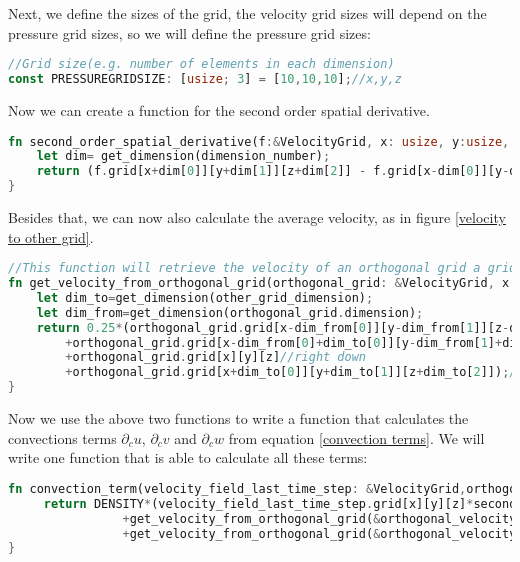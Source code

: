 \documentclass{article}
\begin{document}
Next, we define the sizes of the grid, the velocity grid sizes will depend on the pressure grid sizes, so we will define the pressure grid sizes:
\begin{lstlisting}[language=Rust, style=boxed, breaklines=true]
//Grid size(e.g. number of elements in each dimension)
const PRESSUREGRIDSIZE: [usize; 3] = [10,10,10];//x,y,z
\end{lstlisting}
Now we can create a function for the second order spatial derivative.
\begin{lstlisting}[language=Rust, style=boxed, breaklines=true]
fn second_order_spatial_derivative(f:&VelocityGrid, x: usize, y:usize, z:usize, dimension_number:usize) -> f32{
    let dim= get_dimension(dimension_number);
    return (f.grid[x+dim[0]][y+dim[1]][z+dim[2]] - f.grid[x-dim[0]][y-dim[1]][z-dim[2]])/(2.0*GRIDELEMENTSCALE);
}
\end{lstlisting}
Besides that, we can now also calculate the average velocity, as in figure \ref{velocity to other grid}.
\begin{lstlisting}[language=Rust, style=boxed, breaklines=true]
//This function will retrieve the velocity of an orthogonal grid a grid point of another grid.
fn get_velocity_from_orthogonal_grid(orthogonal_grid: &VelocityGrid, x:usize, y:usize, z:usize, other_grid_dimension:usize) -> f32{
    let dim_to=get_dimension(other_grid_dimension);
    let dim_from=get_dimension(orthogonal_grid.dimension);
    return 0.25*(orthogonal_grid.grid[x-dim_from[0]][y-dim_from[1]][z-dim_from[2]]//Left down
        +orthogonal_grid.grid[x-dim_from[0]+dim_to[0]][y-dim_from[1]+dim_to[1]][z-dim_from[2]+dim_to[2]]//left up
        +orthogonal_grid.grid[x][y][z]//right down
        +orthogonal_grid.grid[x+dim_to[0]][y+dim_to[1]][z+dim_to[2]]);//right up
}
\end{lstlisting}
Now we use the above two functions to write a function that calculates the convections terms \(\partial _cu\), \(\partial _cv\) and \(\partial _cw\) from equation \ref{convection terms}. We will write one function that is able to calculate all these terms: 
\begin{lstlisting}[language=Rust, style=boxed, breaklines=true]
fn convection_term(velocity_field_last_time_step: &VelocityGrid,orthogonal_velocity_field_a: &VelocityGrid, orthogonal_velocity_field_b: &VelocityGrid, x: usize, y:usize, z:usize ) -> f32{// calculate the convection term
     return DENSITY*(velocity_field_last_time_step.grid[x][y][z]*second_order_spatial_derivative(&velocity_field_last_time_step, x, y, z, velocity_field_last_time_step.dimension)
                +get_velocity_from_orthogonal_grid(&orthogonal_velocity_field_a, x, y, z, velocity_field_last_time_step.dimension)*second_order_spatial_derivative(velocity_field_last_time_step, x, y, z, orthogonal_velocity_field_a.dimension)
                +get_velocity_from_orthogonal_grid(&orthogonal_velocity_field_b, x, y, z, velocity_field_last_time_step.dimension)*second_order_spatial_derivative(velocity_field_last_time_step, x, y, z, orthogonal_velocity_field_b.dimension));
}
\end{lstlisting}
\end{document}
